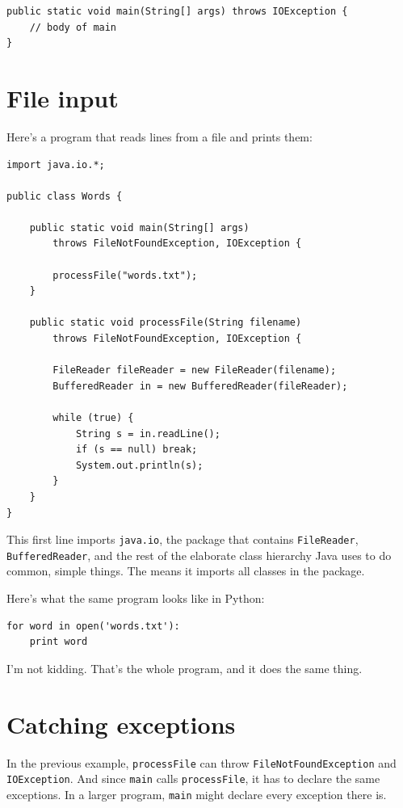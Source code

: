 \documentclass[12pt]{book}
\theoremstyle{exercise}
\begin{document}
\begin {lstlisting}
public static void main(String[] args) throws IOException {
    // body of main
}
\end{lstlisting}


\section{File input}
\label{fileIO}

Here's a program that reads lines from a file and prints them:

\begin{lstlisting}
import java.io.*;

public class Words {

    public static void main(String[] args)
        throws FileNotFoundException, IOException {

        processFile("words.txt");
    }

    public static void processFile(String filename)
        throws FileNotFoundException, IOException {

        FileReader fileReader = new FileReader(filename);
        BufferedReader in = new BufferedReader(fileReader);

        while (true) {
            String s = in.readLine();
            if (s == null) break;
            System.out.println(s);
        }
    }
}
\end{lstlisting}

This first line imports {\tt java.io}, the package that contains
{\tt FileReader}, {\tt BufferedReader}, and the rest of
the elaborate class hierarchy Java uses to do
common, simple things.  The {\tt *} means it imports all classes
in the package.

Here's what the same program looks like in Python:

\begin{verbatim}
for word in open('words.txt'):
    print word
\end{verbatim}

I'm not kidding.  That's the whole program, and it does the same thing.


\section{Catching exceptions}

In the previous example, {\tt processFile} can throw
{\tt FileNotFoundException} and {\tt IOException}.  And since
{\tt main} calls {\tt processFile}, it has to declare the
same exceptions.  In a larger program, {\tt main} might
declare every exception there is.
\end{document}
